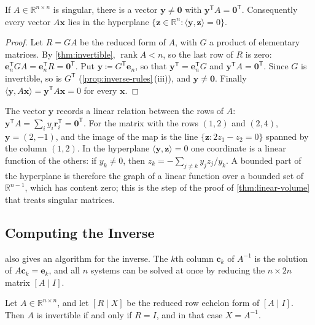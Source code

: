 \begin{proposition}
\label{prop:singular-image}
If $A\in\mathbb R^{n\times n}$ is singular, there is a vector $\mathbf y\ne\mathbf 0$ with $\mathbf y^{\mathsf T}A=\mathbf 0^{\mathsf T}$. Consequently every vector $A\mathbf x$ lies in the hyperplane $\{\mathbf z\in\mathbb R^n: \langle\mathbf y,\mathbf z\rangle=0\}$.
\end{proposition}

\begin{proof}
Let $R=GA$ be the reduced form of $A$, with $G$ a product of elementary matrices. By \cref{thm:invertible}, $\operatorname{rank}A<n$, so the last row of $R$ is zero: $\mathbf e_n^{\mathsf T}GA=\mathbf e_n^{\mathsf T}R=\mathbf 0^{\mathsf T}$. Put $\mathbf y\coloneqq G^{\mathsf T}\mathbf e_n$, so that $\mathbf y^{\mathsf T}=\mathbf e_n^{\mathsf T}G$ and $\mathbf y^{\mathsf T}A=\mathbf 0^{\mathsf T}$. Since $G$ is invertible, so is $G^{\mathsf T}$ (\cref{prop:inverse-rules}\,(iii)), and $\mathbf y\ne\mathbf 0$. Finally $\langle\mathbf y,A\mathbf x\rangle=\mathbf y^{\mathsf T}A\mathbf x=0$ for every $\mathbf x$.
\end{proof}

The vector $\mathbf y$ records a linear relation between the rows of $A$: $\mathbf y^{\mathsf T}A=\sum_iy_i\mathbf r_i^{\mathsf T}=\mathbf 0^{\mathsf T}$. For the matrix with the rows $(1,2)$ and $(2,4)$, $\mathbf y=(2,-1)$, and the image of the map is the line $\{\mathbf z: 2z_1-z_2=0\}$ spanned by the column $(1,2)$. In the hyperplane $\langle\mathbf y,\mathbf z\rangle=0$ one coordinate is a linear function of the others: if $y_k\ne0$, then $z_k=-\sum_{j\ne k}y_jz_j/y_k$. A bounded part of the hyperplane is therefore the graph of a linear function over a bounded set of $\mathbb R^{n-1}$, which has content zero; this is the step of the proof of \cref{thm:linear-volume} that treats singular matrices.

\subsection{Computing the Inverse}

 also gives an algorithm for the inverse. The $k$th column $\mathbf c_k$ of $A^{-1}$ is the solution of $A\mathbf c_k=\mathbf e_k$, and all $n$ systems can be solved at once by reducing the $n\times2n$ matrix $[A\mid I]$.

\begin{proposition}
\label{prop:gauss-jordan}
Let $A\in\mathbb R^{n\times n}$, and let $[R\mid X]$ be the reduced row echelon form of $[A\mid I]$. Then $A$ is invertible if and only if $R=I$, and in that case $X=A^{-1}$.
\end{proposition}

